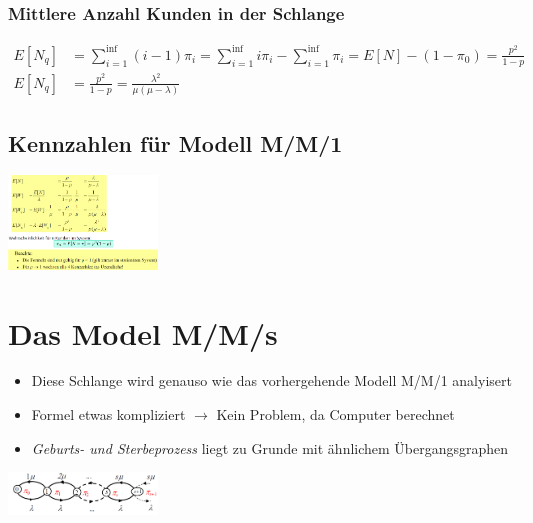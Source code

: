 \documentclass{report}
\newenvironment{Figure}
	{\par\medskip\noindent\minipage{\linewidth}}
	{\endminipage\par\medskip}
\theoremstyle{definition}
\theoremstyle{example}
\begin{document}
      \subsubsection{Mittlere Anzahl Kunden in der Schlange}
\begin{equation}
   \begin{split}

      E[N_q] &= \sum^\inf_{i=1} (i-1) \pi_i = \sum^\inf_{i=1} i \pi_i - \sum^\inf_{i=1} \pi_i = E[N]-(1-\pi_0) = \frac{p^2}{1-p} \\
      E[N_q] &= \frac{p^2}{1-p} = \frac{\lambda^2}{\mu(\mu - \lambda)}

   \end{split}
\end{equation}

   \subsection{Kennzahlen für Modell M/M/1}
\begin{Figure}
\centering
\includegraphics[width=150px]{img/KennzahlenMM1.png}
	\label{fig:Überblick der Kennzahlen für das Modell MM1}
\end{Figure}

\section{Das Model M/M/s}

\begin{itemize}
   \item Diese Schlange wird genauso wie das vorhergehende Modell M/M/1 analyisert
   \item Formel etwas kompliziert $\rightarrow$ Kein Problem, da Computer berechnet
   \item \textit{Geburts- und Sterbeprozess} liegt zu Grunde mit ähnlichem Übergangsgraphen
\end{itemize}

\begin{Figure}
\centering
\includegraphics[width=150px]{img/UebergangsgraphenMMs.png}
	\label{fig:Abbildung eines Überblickgraphen für das Modell MMs}
\end{Figure}
\end{document}
